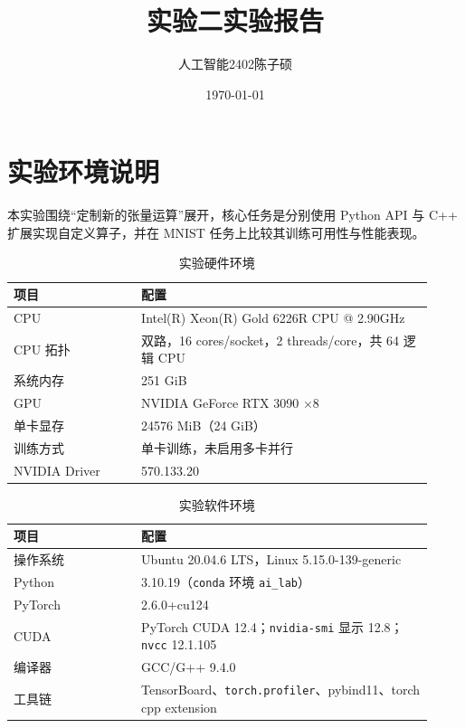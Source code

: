 \documentclass{article}
\title{实验二\hspace{2em}实验报告}
\author{人工智能2402\hspace{1em}陈子硕}
\date{\today}
\begin{document}
\maketitle

\section{实验环境说明}
本实验围绕“定制新的张量运算”展开，核心任务是分别使用 Python API 与 C++ 扩展实现自定义算子，并在 MNIST 任务上比较其训练可用性与性能表现。

\begin{table}[H]
\centering
\caption{实验硬件环境}
\label{tab:hardware_env}
\begin{tabular}{p{0.28\linewidth} p{0.64\linewidth}}
\toprule
项目 & 配置 \\
\midrule
CPU & Intel(R) Xeon(R) Gold 6226R CPU @ 2.90GHz \\
CPU 拓扑 & 双路，16 cores/socket，2 threads/core，共 64 逻辑 CPU \\
系统内存 & 251 GiB \\
GPU & NVIDIA GeForce RTX 3090 $\times 8$ \\
单卡显存 & 24576 MiB（24 GiB） \\
训练方式 & 单卡训练，未启用多卡并行 \\
NVIDIA Driver & 570.133.20 \\
\bottomrule
\end{tabular}
\end{table}

\begin{table}[H]
\centering
\caption{实验软件环境}
\label{tab:software_env}
\begin{tabular}{p{0.28\linewidth} p{0.64\linewidth}}
\toprule
项目 & 配置 \\
\midrule
操作系统 & Ubuntu 20.04.6 LTS，Linux 5.15.0-139-generic \\
Python & 3.10.19（\texttt{conda} 环境 \texttt{ai\_lab}） \\
PyTorch & 2.6.0+cu124 \\
CUDA & PyTorch CUDA 12.4；\texttt{nvidia-smi} 显示 12.8；\texttt{nvcc} 12.1.105 \\
编译器 & GCC/G++ 9.4.0 \\
工具链 & TensorBoard、\texttt{torch.profiler}、pybind11、torch cpp extension \\
\bottomrule
\end{tabular}
\end{table}
\end{document}
